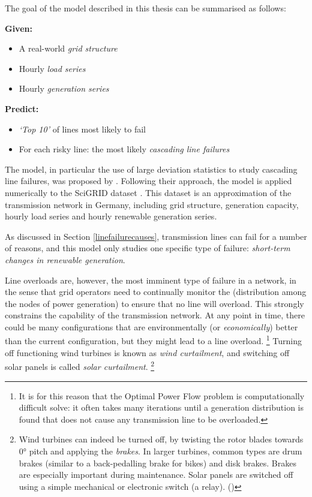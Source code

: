 \documentclass[main.tex]{subfiles}
\begin{document}
The goal of the model described in this thesis can be summarised as follows:


\textbf{Given:}
\begin{itemize}
    \item A real-world \emph{grid structure}
    \item Hourly \emph{load series}
    \item Hourly \emph{generation series}
\end{itemize}

\textbf{Predict:}
\begin{itemize}
    \item \emph{`Top 10'} of lines most likely to fail
    \item For each risky line: the most likely \emph{cascading line failures}
\end{itemize}

The model, in particular the use of large deviation statistics to study cascading line failures, was proposed by \citet{Nesti2018emergentfailures}.\nocite{Nesti2018supplemental} Following their approach, the model is applied numerically to the SciGRID dataset \citep{SciGRIDv0.2}. This dataset is an approximation of the transmission network in Germany, including grid structure, generation capacity, hourly load series and hourly renewable generation series.

As discussed in Section \ref{linefailurecauses}, transmission lines can fail for a number of reasons, and this model only studies one specific type of failure: \emph{short-term changes in renewable generation}.






Line overloads are, however, the most imminent type of failure in a network, in the sense that grid operators need to continually monitor the  (distribution among the nodes of power generation) to ensure that no line will overload.
This strongly constrains the capability of the transmission network. At any point in time, there could be many configurations that are environmentally (or \emph{economically}) better than the current configuration, but they might lead to a line overload.%
\footnote{It is for this reason that the Optimal Power Flow problem is computationally difficult solve: it often takes many iterations until a generation distribution is found that does not cause any transmission line to be overloaded.}
Turning off functioning wind turbines is known as \emph{wind curtailment}, and switching off solar panels is called \emph{solar curtailment}.%
\footnote{Wind turbines can indeed be turned off, by twisting the rotor blades towards $0\si{\degree}$ pitch and applying the \emph{brakes}. In larger turbines, common types are drum brakes (similar to a back-pedalling brake for bikes) and disk brakes. Brakes are especially important during maintenance.
Solar panels are switched off using a simple mechanical or electronic switch (a relay). (\cite{Denholm2015})}
\end{document}
